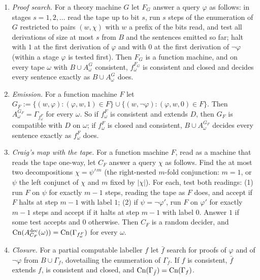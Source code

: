 \begin{lemma}\label{lem:soi:maps}
\begin{enumerate}[label=(\roman*),leftmargin=*]
\item \emph{Proof search.} For a theory machine $G$ let $F_G$ answer a query $\varphi$ as follows: in stages $s=1,2,\dots$ read the tape up to bit $s$, run $s$ steps of the enumeration of $G$ restricted to pairs $(w,\chi)$ with $w$ a prefix of the bits read, and test all derivations of size at most $s$ from $B$ and the sentences emitted so far; halt with $1$ at the first derivation of $\varphi$ and with $0$ at the first derivation of $\neg\varphi$ (within a stage $\varphi$ is tested first). Then $F_G$ is a function machine, and on every tape $\omega$ with $B\cup A^G_\omega$ consistent, $f^{F_G}_\omega$ is consistent and closed and decides every sentence exactly as $B\cup A^G_\omega$ does.
\item \emph{Emission.} For a function machine $F$ let $G_F:=\{(w,\varphi):(\varphi,w,1)\in F\}\cup\{(w,\neg\varphi):(\varphi,w,0)\in F\}$. Then $A^{G_F}_\omega=\Gamma_{f^F_\omega}$ for every $\omega$. So if $f^F_\omega$ is consistent and extends $D$, then $G_F$ is compatible with $D$ on $\omega$; if $f^F_\omega$ is closed and consistent, $B\cup A^{G_F}_\omega$ decides every sentence exactly as $f^F_\omega$ does.
\item \emph{Craig's map with the tape.} For a function machine $F$, read as a machine that reads the tape one-way, let $C_F$ answer a query $\chi$ as follows. Find the at most two decompositions $\chi=\psi^{\wedge m}$ (the right-nested $m$-fold conjunction: $m=1$, or $\psi$ the left conjunct of $\chi$ and $m$ fixed by $\lvert\chi\rvert$). For each, test both readings: (1) run $F$ on $\psi$ for exactly $m-1$ steps, reading the tape as $F$ does, and accept if $F$ halts at step $m-1$ with label $1$; (2) if $\psi=\neg\varphi'$, run $F$ on $\varphi'$ for exactly $m-1$ steps and accept if it halts at step $m-1$ with label $0$. Answer $1$ if some test accepts and $0$ otherwise. Then $C_F$ is a random decider, and $\mathrm{Cn}(A^{\mathrm{dec}}_{C_F}(\omega))=\mathrm{Cn}(\Gamma_{f^F_\omega})$ for every $\omega$.
\item \emph{Closure.} For a partial computable labeller $f$ let $\bar f$ search for proofs of $\varphi$ and of $\neg\varphi$ from $B\cup\Gamma_f$, dovetailing the enumeration of $\Gamma_f$. If $f$ is consistent, $\bar f$ extends $f$, is consistent and closed, and $\mathrm{Cn}(\Gamma_{\bar f})=\mathrm{Cn}(\Gamma_f)$.
\end{enumerate}
\end{lemma}

